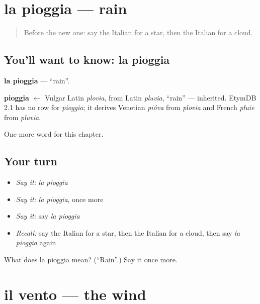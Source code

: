 \section[la pioggia]{la pioggia — rain}

\label{lesson:IT-C67-pioggia}



\begin{quote}
Before the new one: say the Italian for a star, then the Italian for a cloud.
\end{quote}

\subsection*{You'll want to know: la pioggia}
\textbf{la pioggia} — \textquotedblleft{}rain\textquotedblright{}.

\begin{cousinweb}
\textbf{pioggia} $\leftarrow$ Vulgar Latin \emph{plovia}, from Latin \emph{pluvia}, \textquotedblleft{}rain\textquotedblright{} — inherited. EtymDB 2.1 has no row for \emph{pioggia}; it derives Venetian \emph{pióva} from \emph{plovia} and French \emph{pluie} from \emph{pluvia}.
\end{cousinweb}

\begin{grammarlens}[title={What you've built}]
One more word for this chapter.
\end{grammarlens}

\subsection*{Your turn}
\begin{itemize}
\raggedright
  \item \emph{Say it:} \emph{la pioggia}
  \item \emph{Say it:} \emph{la pioggia}, once more
  \item \emph{Say it:} say \emph{la pioggia}
  \item \emph{Recall:} say the Italian for a star, then the Italian for a cloud, then say \emph{la pioggia} again
\end{itemize}

\begin{tcolorbox}[breakable,colback=teal!4,colframe=teal!35!black,title={Before you move on}]
What does la pioggia mean? (\textquotedblleft{}Rain\textquotedblright{}.) Say it once more.
\end{tcolorbox}
\section[il vento]{il vento — the wind}

